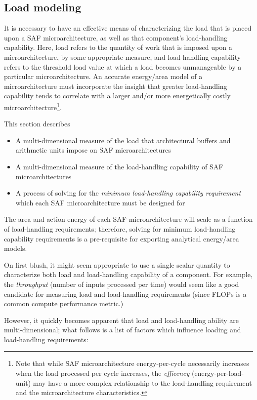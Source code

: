 \subsection{Load modeling}

It is necessary to have an effective means of characterizing the load that is placed upon a SAF microarchitecture, as well as that component's load-handling capability. Here, load refers to the quantity of work that is imposed upon a microarchitecture, by some appropriate measure, and load-handling capability refers to the threshold load value at which a load becomes unmanageable by a particular microarchitecture. An accurate energy/area model of a microarchitecture must incorporate the insight that greater load-handling capability tends to correlate with a larger and/or more energetically costly microarchitecture\footnote{Note that while SAF microarchitecture energy-per-cycle necessarily increases when the load processed per cycle increases, the \textit{efficency} (energy-per-load-unit) may have a more complex relationship to the load-handling requirement and the microarchitecture characteristics.}.

This section describes
\begin{itemize}
\item A multi-dimensional measure of the load that architectural buffers and arithmetic units impose on SAF microarchitectures
\item A multi-dimensional measure of the load-handling capability of SAF microarchitectures
\item A process of solving for the \textit{minimum load-handling capability requirement} which each SAF microarchitecture must be designed for
\end{itemize}

The area and action-energy of each SAF microarchitecture will scale as a function of load-handling requirements; therefore, solving for minimum load-handling capability requirements is a pre-requisite for exporting analytical energy/area models.

On first blush, it might seem appropriate to use a single scalar quantity to characterize both load and load-handling capability of a component. For example, the \textit{throughput} (number of inputs processed per time) would seem like a good candidate for measuring load and load-handling requirements (since FLOPs is a common compute performance metric.)

However, it quickly becomes apparent that load and load-handling ability are multi-dimensional; what follows is a list of factors which influence loading and load-handling requirements:

